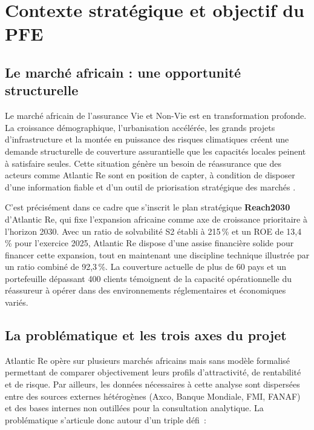 \documentclass[12pt,a4paper]{report}
\begin{document}
\section{Contexte stratégique et objectif du PFE}

\subsection{Le marché africain : une opportunité structurelle}

Le marché africain de l'assurance Vie et Non-Vie est en transformation profonde. La
croissance démographique, l'urbanisation accélérée, les grands projets d'infrastructure
et la montée en puissance des risques climatiques créent une demande structurelle
de couverture assurantielle que les capacités locales peinent à satisfaire seules.
Cette situation génère un besoin de réassurance que des acteurs comme Atlantic Re
sont en position de capter, à condition de disposer d'une information fiable et
d'un outil de priorisation stratégique des marchés .

C'est précisément dans ce cadre que s'inscrit le plan stratégique \textbf{Reach2030}
d'Atlantic Re, qui fixe l'expansion africaine comme axe de croissance prioritaire à
l'horizon 2030. Avec un ratio de solvabilité S2 établi à 215\,\% et un ROE de
13,4\,\% pour l'exercice 2025, Atlantic Re dispose d'une assise financière solide
pour financer cette expansion, tout en maintenant une discipline technique illustrée
par un ratio combiné de 92,3\,\%. La couverture actuelle de plus de 60 pays et un
portefeuille dépassant 400 clients témoignent de la capacité opérationnelle du
réassureur à opérer dans des environnements réglementaires et économiques variés.

\subsection{La problématique et les trois axes du projet}

Atlantic Re opère sur plusieurs marchés africains mais sans modèle formalisé
permettant de comparer objectivement leurs profils d'attractivité, de rentabilité
et de risque. Par ailleurs, les données nécessaires à cette analyse sont dispersées
entre des sources externes hétérogènes (Axco, Banque Mondiale, FMI, FANAF) et des
bases internes non outillées pour la consultation analytique. La problématique
s'articule donc autour d'un triple défi~:
\end{document}
